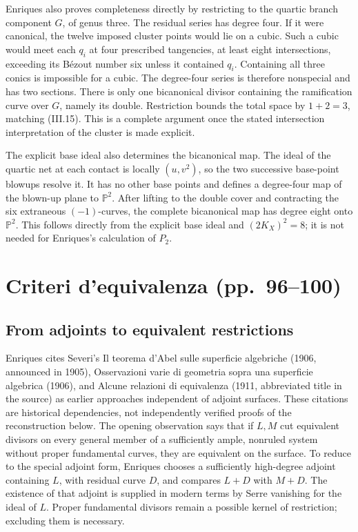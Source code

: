 Enriques also proves completeness directly by restricting to the quartic branch component \(G\), of genus three. The residual series has degree four. If it were canonical, the twelve imposed cluster points would lie on a cubic. Such a cubic would meet each \(q_i\) at four prescribed tangencies, at least eight intersections, exceeding its Bézout number six unless it contained \(q_i\). Containing all three conics is impossible for a cubic. The degree-four series is therefore nonspecial and has two sections. There is only one bicanonical divisor containing the ramification curve over \(G\), namely its double. Restriction bounds the total space by \(1+2=3\), matching (III.15). This is a complete argument once the stated intersection interpretation of the cluster is made explicit.

The explicit base ideal also determines the bicanonical map. The ideal of the quartic net at each contact is locally \((u,v^2)\), so the two successive base-point blowups resolve it. It has no other base points and defines a degree-four map of the blown-up plane to \(\mathbb{P}^2\). After lifting to the double cover and contracting the six extraneous \((-1)\)-curves, the complete bicanonical map has degree eight onto \(\mathbb{P}^2\). This follows directly from the explicit base ideal and \((2K_X)^2=8\); it is not needed for Enriques's calculation of \(P_2\).

\section[Criteri d'equivalenza]{Criteri d'equivalenza (pp.~96--100)}\label{commentary-III-13}

\subsection{From adjoints to equivalent restrictions}

Enriques cites Severi's Il teorema d'Abel sulle superficie algebriche (1906, announced in 1905), Osservazioni varie di geometria sopra una superficie algebrica (1906), and Alcune relazioni di equivalenza (1911, abbreviated title in the source) as earlier approaches independent of adjoint surfaces. These citations are historical dependencies, not independently verified proofs of the reconstruction below. The opening observation says that if \(L,M\) cut equivalent divisors on every general member of a sufficiently ample, nonruled system without proper fundamental curves, they are equivalent on the surface. To reduce to the special adjoint form, Enriques chooses a sufficiently high-degree adjoint containing \(L\), with residual curve \(D\), and compares \(L+D\) with \(M+D\). The existence of that adjoint is supplied in modern terms by Serre vanishing for the ideal of \(L\). Proper fundamental divisors remain a possible kernel of restriction; excluding them is necessary.


